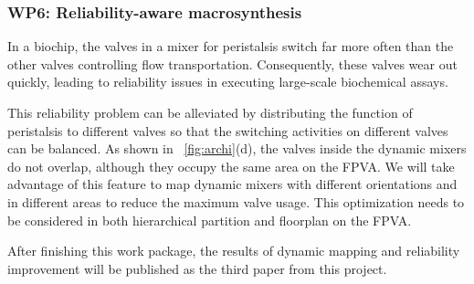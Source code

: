 
\subsubsection{WP6: Reliability-aware macrosynthesis}

In a biochip, the valves in a mixer for peristalsis switch far more often
than the other valves controlling flow transportation. 
Consequently, these valves wear out quickly, leading to reliability issues 
in executing large-scale biochemical assays. 

This reliability problem can be alleviated by distributing the function of
peristalsis to different valves
so that the switching
activities on different valves can be balanced. As shown in
\figname~\ref{fig:archi}(d), the valves inside the dynamic mixers do
not overlap, although they occupy the same area on the FPVA. We will
take advantage of this feature to map dynamic mixers with different
orientations and in different areas to reduce the maximum valve usage. 
This optimization needs to be considered in both hierarchical partition 
and floorplan on the FPVA. 

After finishing this work package, the results of dynamic mapping and
reliability improvement will be published as the third paper from this project.
